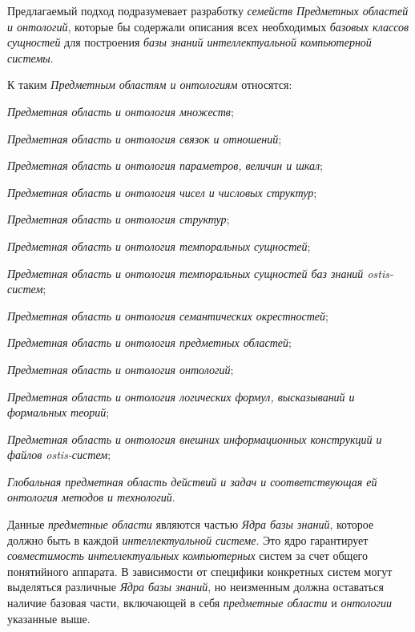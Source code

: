 Предлагаемый подход подразумевает разработку \textit{семейств Предметных областей и онтологий}, которые бы содержали описания всех необходимых \textit{базовых классов сущностей} для построения \textit{базы знаний интеллектуальной компьютерной системы}.

К таким \textit{Предметным областям и онтологиям} относятся:

\begin{textitemize}
\item \textit{Предметная область и онтология множеств};
\item \textit{Предметная область и онтология связок и отношений};
\item \textit{Предметная область и онтология параметров, величин и шкал};
\item \textit{Предметная область и онтология чисел и числовых структур};
\item \textit{Предметная область и онтология структур};
\item \textit{Предметная область и онтология темпоральных сущностей};
\item \textit{Предметная область и онтология темпоральных сущностей баз знаний ostis-систем};
\item \textit{Предметная область и онтология семантических окрестностей};
\item \textit{Предметная область и онтология предметных областей};
\item \textit{Предметная область и онтология онтологий};
\item \textit{Предметная область и онтология логических формул, высказываний и формальных теорий};
\item \textit{Предметная область и онтология внешних информационных конструкций и файлов ostis-систем};
\item \textit{Глобальная предметная область действий и задач и соответствующая ей онтология методов и технологий}.
\end{textitemize}

Данные \textit{предметные области} являются частью \textit{Ядра базы знаний}, которое должно быть в каждой \textit{интеллектуальной системе}. Это ядро гарантирует \textit{совместимость интеллектуальных компьютерных} систем за счет общего понятийного аппарата. В зависимости от специфики конкретных систем могут выделяться различные \textit{Ядра базы знаний}, но неизменным должна оставаться наличие базовая части, включающей в себя \textit{предметные области} и \textit{онтологии} указанные выше.

